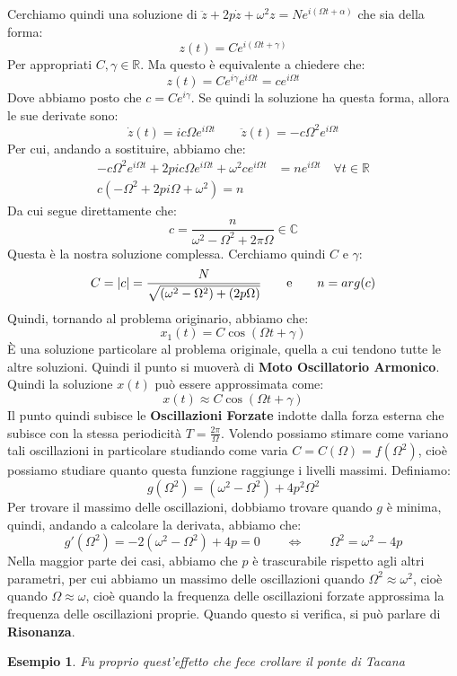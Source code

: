 \documentclass[11pt,a4paper,twoside]{article}
\newtheorem{es}{Esempio}
\theoremstyle{definition}
\begin{document}
Cerchiamo quindi una soluzione di $\ddot z + 2p \dot z + \omega^2z = Ne^{i(\Omega t + \alpha)}$ che sia della forma:
\[ z(t) = Ce^{i (\Omega t + \gamma)} \]
Per appropriati $C, \gamma \in \mathbb R$. Ma questo è equivalente a chiedere che:
\[ z(t) = Ce^{i\gamma}e^{i \Omega t} = ce^{i\Omega t}\]
Dove abbiamo posto che $c = Ce^{i \gamma}$. Se quindi la soluzione ha questa forma, allora le sue derivate sono:
\[ \dot z(t) = ic\Omega e^{i \Omega t}\qquad \ddot z(t) = -c\Omega^2 e^{i \Omega t} \]
Per cui, andando a sostituire, abbiamo che:
\begin{align*}
	-c\Omega^2 e^{i \Omega t} + 2pic\Omega e^{i \Omega t} + \omega^2 ce^{i \Omega t} &= ne^{i \Omega t} \quad \forall t \in \mathbb R\\
	c(-\Omega^2 + 2pi\Omega + \omega^2) = n
\end{align*}
Da cui segue direttamente che:
\[ c = \frac{n}{\omega^2 - \Omega^2 + 2\pi\Omega} \in \mathbb C \]
Questa è la nostra soluzione complessa. Cerchiamo quindi $C$ e $\gamma$:
\[ C = |c| = \frac{N}{\sqrt{(\omega^2-\Omega^2) + (2p\Omega)}} \qquad \text e \qquad n = arg(c)\]
Quindi, tornando al problema originario, abbiamo che:
\[ x_1(t) = C \cos (\Omega t + \gamma) \]
È una soluzione particolare al problema originale, quella a cui tendono tutte le altre soluzioni. Quindi il punto si muoverà di \textbf{Moto Oscillatorio Armonico}. Quindi la soluzione $x(t)$ può essere approssimata come:
\[ x(t) \approx C\cos(\Omega t + \gamma) \]
Il punto quindi subisce le \textbf{Oscillazioni Forzate} indotte dalla forza esterna che subisce con la stessa periodicità $T = \frac{2 \pi}{\Omega}$.
Volendo possiamo stimare come variano tali oscillazioni in particolare studiando come varia $C = C(\Omega) = f(\Omega^2)$, cioè possiamo studiare quanto questa funzione raggiunge i livelli massimi. Definiamo:
\[ g(\Omega^2) = (\omega^2- \Omega^2) + 4 p^2\Omega^2 \]
Per trovare il massimo delle oscillazioni, dobbiamo trovare quando $g$ è minima, quindi, andando a calcolare la derivata, abbiamo che:
\[ g'(\Omega^2) = -2(\omega^2 - \Omega^2) + 4p = 0 \qquad \Leftrightarrow \qquad \Omega^2 = \omega^2 - 4p\]
Nella maggior parte dei casi, abbiamo che $p$ è trascurabile rispetto agli altri parametri, per cui abbiamo un massimo delle oscillazioni quando $\Omega^2 \approx \omega^2$, cioè quando $\Omega \approx \omega$, cioè quando la frequenza delle oscillazioni forzate approssima la frequenza delle oscillazioni proprie. Quando questo si verifica, si può parlare di \textbf{Risonanza}.

\begin{es}
	Fu proprio quest'effetto che fece crollare il ponte di Tacana
\end{es}
\end{document}
